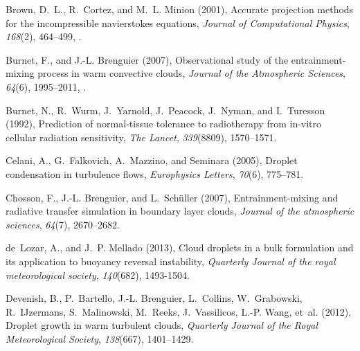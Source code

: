 \documentclass[draft,linenumbers]{agujournal}
\begin{document}
\begin{thebibliography}{60}
Brown, D.~L., R.~Cortez, and M.~L. Minion (2001), Accurate projection methods
  for the incompressible navier{\textendash}stokes equations, \textit{Journal
  of Computational Physics}, \textit{168}(2), 464--499,
  .

Burnet, F., and J.-L. Brenguier (2007), Observational study of the
  entrainment-mixing process in warm convective clouds, \textit{Journal of the
  Atmospheric Sciences}, \textit{64}(6), 1995--2011, .

Burnet, N., R.~Wurm, J.~Yarnold, J.~Peacock, J.~Nyman, and I.~Turesson (1992),
  Prediction of normal-tissue tolerance to radiotherapy from in-vitro cellular
  radiation sensitivity, \textit{The Lancet}, \textit{339}(8809), 1570--1571.

Celani, A., G.~Falkovich, A.~Mazzino, and Seminara (2005), Droplet condensation
  in turbulence flows, \textit{Europhysics Letters}, \textit{70}(6), 775--781.

Chosson, F., J.-L. Brenguier, and L.~Sch{\"u}ller (2007), Entrainment-mixing
  and radiative transfer simulation in boundary layer clouds, \textit{Journal
  of the atmospheric sciences}, \textit{64}(7), 2670--2682.

de~Lozar, A., and J.~P. Mellado (2013), Cloud droplets in a bulk formulation and its application to buoyancy reversal instability, \textit{Quarterly Journal of the royal meteorological society}, \textit{140}(682), 1493-1504.

Devenish, B., P.~Bartello, J.-L. Brenguier, L.~Collins, W.~Grabowski,
  R.~IJzermans, S.~Malinowski, M.~Reeks, J.~Vassilicos, L.-P. Wang, et~al.
  (2012), Droplet growth in warm turbulent clouds, \textit{Quarterly Journal of
  the Royal Meteorological Society}, \textit{138}(667), 1401--1429.


\end{thebibliography}
\end{document}
